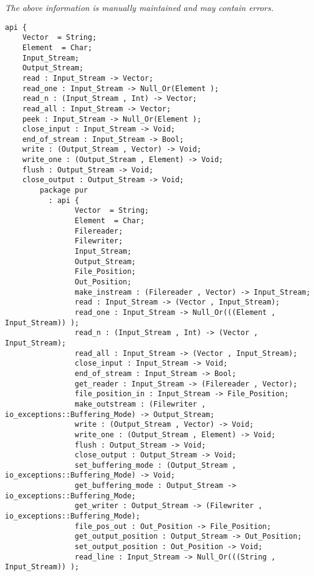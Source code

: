 \label{api:Winix\_Text\_File\_For\_Os\_\_Premicrothread}

{\tiny \it The above information is manually maintained and may contain errors.}
\begin{verbatim}
api {
    Vector  = String;
    Element  = Char;
    Input_Stream;
    Output_Stream;
    read : Input_Stream -> Vector;
    read_one : Input_Stream -> Null_Or(Element );
    read_n : (Input_Stream , Int) -> Vector;
    read_all : Input_Stream -> Vector;
    peek : Input_Stream -> Null_Or(Element );
    close_input : Input_Stream -> Void;
    end_of_stream : Input_Stream -> Bool;
    write : (Output_Stream , Vector) -> Void;
    write_one : (Output_Stream , Element) -> Void;
    flush : Output_Stream -> Void;
    close_output : Output_Stream -> Void;
        package pur
          : api {
                Vector  = String;
                Element  = Char;
                Filereader;
                Filewriter;
                Input_Stream;
                Output_Stream;
                File_Position;
                Out_Position;
                make_instream : (Filereader , Vector) -> Input_Stream;
                read : Input_Stream -> (Vector , Input_Stream);
                read_one : Input_Stream -> Null_Or(((Element , Input_Stream)) );
                read_n : (Input_Stream , Int) -> (Vector , Input_Stream);
                read_all : Input_Stream -> (Vector , Input_Stream);
                close_input : Input_Stream -> Void;
                end_of_stream : Input_Stream -> Bool;
                get_reader : Input_Stream -> (Filereader , Vector);
                file_position_in : Input_Stream -> File_Position;
                make_outstream : (Filewriter , io_exceptions::Buffering_Mode) -> Output_Stream;
                write : (Output_Stream , Vector) -> Void;
                write_one : (Output_Stream , Element) -> Void;
                flush : Output_Stream -> Void;
                close_output : Output_Stream -> Void;
                set_buffering_mode : (Output_Stream , io_exceptions::Buffering_Mode) -> Void;
                get_buffering_mode : Output_Stream -> io_exceptions::Buffering_Mode;
                get_writer : Output_Stream -> (Filewriter , io_exceptions::Buffering_Mode);
                file_pos_out : Out_Position -> File_Position;
                get_output_position : Output_Stream -> Out_Position;
                set_output_position : Out_Position -> Void;
                read_line : Input_Stream -> Null_Or(((String , Input_Stream)) );

\end{verbatim}
